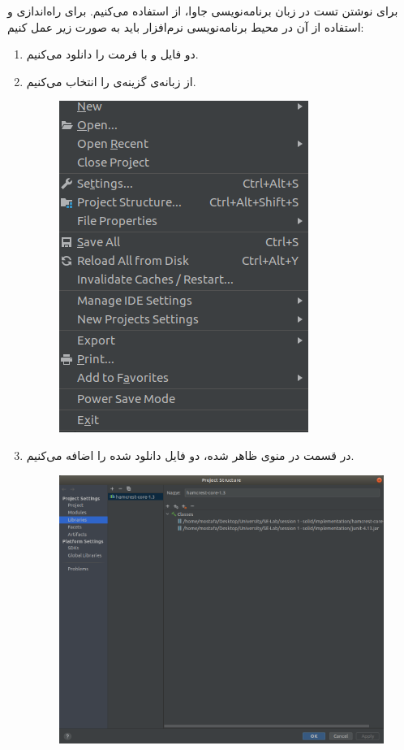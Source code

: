 
برای نوشتن تست در زبان برنامه‌نویسی جاوا، از  استفاده می‌کنیم. برای راه‌اندازی و استفاده از آن در محیط برنامه‌نویسی نرم‌افزار  باید به صورت زیر عمل کنیم:
\begin{enumerate}
	\item دو فایل  و  با فرمت  را دانلود می‌کنیم.
	\item از زبانه‌ی  گزینه‌ی  را انتخاب می‌کنیم.
	\begin{figure}[hbpt!]
		\centering
		\includegraphics[scale=0.3]{./img/1.png}
	\end{figure}
	\item در قسمت  در منوی ظاهر شده، دو فایل دانلود شده را اضافه می‌کنیم.
	\begin{figure}[hbpt!]
		\centering
		\includegraphics[scale=0.3]{./img/2.png}
	\end{figure}
\end{enumerate}

